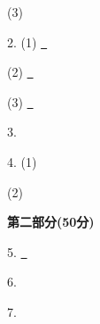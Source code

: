 \documentclass[11pt]{article}
\newcommand{\s}{\uline{\qquad \qquad \qquad \qquad} \quad} %
\newcommand{\m}{\uline{\qquad \qquad \qquad \qquad \qquad \qquad \qquad \qquad \quad \ } \quad} %
\renewcommand{\u}{\uline{\hfill}} %
\begin{document}
\begin{minipage}{0.477\linewidth}
\begin{tcolorbox}[left=0.5mm,right=0.5mm,height=21.5cm,colback=white,boxrule=0.5pt]
\begin{framed}
        \quad (3) \u

        2. (1) \m \u

        \quad (2) \m \u

        \quad (3) \m \u

        3. \s \u

        4. (1) \u
        
        \qquad \u

        \quad (2) \u
        
        \qquad \u
    \end{framed}

    \vspace{-10pt}
    {\bfseries 第二部分(50分)}
    \vspace{-10pt}
    \begin{framed}
        5. \m \u

        6. \u

        \quad \u

        \quad \u

        7. \u
    \end{framed}


        \end{tcolorbox}
    \end{minipage}\hfill
\end{document}

